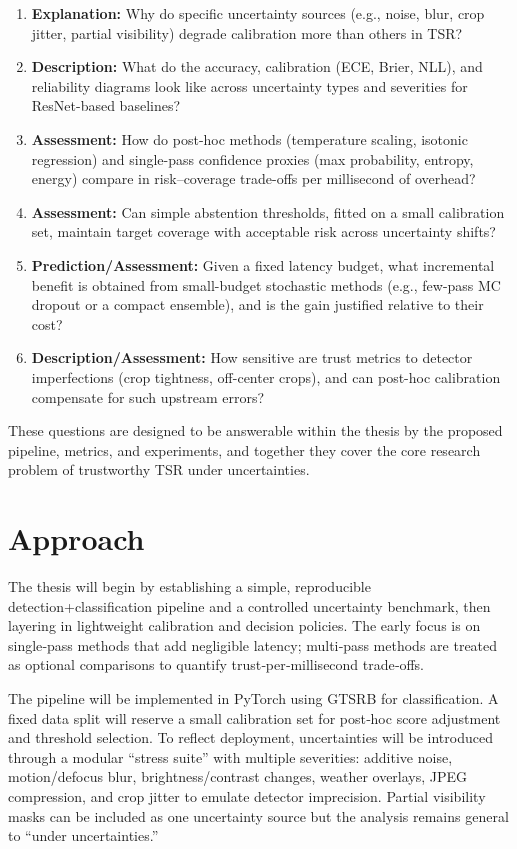 \documentclass[11pt,a4paper]{article}
\begin{document}
\begin{enumerate}
  \item \textbf{Explanation:} Why do specific uncertainty sources (e.g., noise, blur, crop jitter, partial visibility) degrade calibration more than others in TSR?
  \item \textbf{Description:} What do the accuracy, calibration (ECE, Brier, NLL), and reliability diagrams look like across uncertainty types and severities for ResNet-based baselines?
  \item \textbf{Assessment:} How do post-hoc methods (temperature scaling, isotonic regression) and single-pass confidence proxies (max probability, entropy, energy) compare in risk–coverage trade-offs per millisecond of overhead?
  \item \textbf{Assessment:} Can simple abstention thresholds, fitted on a small calibration set, maintain target coverage with acceptable risk across uncertainty shifts?
  \item \textbf{Prediction/Assessment:} Given a fixed latency budget, what incremental benefit is obtained from small-budget stochastic methods (e.g., few-pass MC dropout or a compact ensemble), and is the gain justified relative to their cost?
  \item \textbf{Description/Assessment:} How sensitive are trust metrics to detector imperfections (crop tightness, off-center crops), and can post-hoc calibration compensate for such upstream errors?
\end{enumerate}

These questions are designed to be answerable within the thesis by the proposed pipeline, metrics, and experiments, and together they cover the core research problem of trustworthy TSR under uncertainties.

\section{Approach}

The thesis will begin by establishing a simple, reproducible detection+classification pipeline and a controlled uncertainty benchmark, then layering in lightweight calibration and decision policies. The early focus is on single‑pass methods that add negligible latency; multi‑pass methods are treated as optional comparisons to quantify trust‑per‑millisecond trade‑offs.

The pipeline will be implemented in PyTorch using GTSRB for classification. A fixed data split will reserve a small calibration set for post‑hoc score adjustment and threshold selection. To reflect deployment, uncertainties will be introduced through a modular “stress suite” with multiple severities: additive noise, motion/defocus blur, brightness/contrast changes, weather overlays, JPEG compression, and crop jitter to emulate detector imprecision. Partial visibility masks can be included as one uncertainty source but the analysis remains general to “under uncertainties.”
\end{document}
